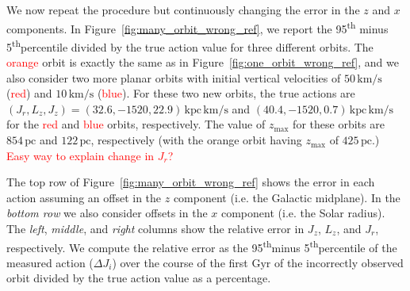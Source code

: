 \documentclass[twocolumn]{aastex62}
\newcommand{\Gus}[1]{\textcolor{red}{#1}}
\newcommand{\pc}{\text{pc}}
\newcommand{\kpc}{\text{kpc}}
\newcommand{\Gyr}{\text{Gyr}}
\newcommand{\kms}{\text{km}/\text{s}}
\newcommand{\actunit}{\text{kpc}\,\kms}
\newcommand{\uth}{\textsuperscript{th}}
\begin{document}
\begin{figure*}
\caption{The artificial phase-dependence in the observed actions induced by an
error in the Galactocentric coordinate system. We consider here an orbit with
initial position $(8,0,0)\,\kpc$ and initial velocity $(0,-190,30)\,\kms$.
This corresponds to an orbit with actions $(J_r, L_z, J_z) = (37.9, -1520,
7.0)\,\actunit$ and $z_{\text{max}}=425\,\pc$. We integrate the orbit
according to the procedure laid out in Section~\ref{ssec:action_comp}. Then,
we subtract $100\,\pc$ from the $z$ value of each position in the orbit,
corresponding to an erroneous observer assuming a midplane that is off by
$100\,\pc$. We then allow our (immortal) observer to observe the orbit over
$1\,\Gyr$ and perform the same orbit integration procedure at each timestep,
and report the values of the actions. The computation of $L_z$ is pristine to
errors in $z$, with only numerical artifacts remaining. Only small errors are
induced in $J_r$, with the middle $90\%$ of values over the $\Gyr$ being
$\sim6\%$ of the true $J_r$. As expected, large errors are induced in $J_z$,
with the middle $90\%$ of values being $\sim85\%$ of the true $J_z$.}
\label{fig:one_orbit_wrong_ref}
\end{figure*}

We now repeat the procedure but continuously changing the error in the $z$ and
$x$ components. In Figure~\ref{fig:many_orbit_wrong_ref}, we report the 95\uth
minus 5\uth percentile divided by the true action value for three different
orbits. The \Gus{orange} orbit is exactly the same as in
Figure~\ref{fig:one_orbit_wrong_ref}, and we also consider two more planar
orbits with initial vertical velocities of $50\,\kms$ (\Gus{red}) and
$10\,\kms$ (\Gus{blue}). For these two new orbits, the true actions are $(J_r,
L_z, J_z) = (32.6, -1520, 22.9)\,\actunit$ and $(40.4, -1520, 0.7)\,\actunit$
for the \Gus{red} and \Gus{blue} orbits, respectively. The value of
$z_{\text{max}}$ for these orbits are $854\,\pc$ and $122\,\pc$, respectively
(with the orange orbit having $z_{\text{max}}$ of $425\,\pc$.) \Gus{Easy way
to explain change in $J_r$?}

The top row of Figure~\ref{fig:many_orbit_wrong_ref} shows the error in each
action assuming an offset in the $z$ component (i.e. the Galactic midplane).
In the {\em bottom row} we also consider offsets in the $x$ component (i.e.
the Solar radius). The {\em left}, {\em middle}, and {\em right} columns show
the relative error in $J_z$, $L_z$, and $J_r$, respectively. We compute the
relative error as the  95\uth minus 5\uth percentile of the measured action
($\Delta J_i$) over the course of the first $\Gyr$ of the incorrectly observed
orbit divided by the true action value as a percentage.
\end{document}

